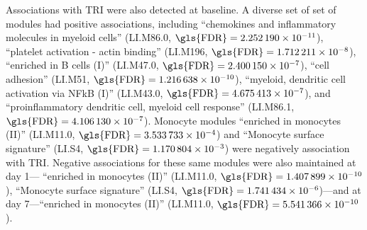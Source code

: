 Associations with \gls{TRI} were also detected at baseline.
A diverse set of set of modules had positive associations, including
\enquote{chemokines and inflammatory molecules in myeloid cells} (LI.M86.0,  $\text{\gls{FDR}} = \num{2.252190e-11}$),
\enquote{platelet activation - actin binding} (LI.M196, $\text{\gls{FDR}} = \num{1.712211e-08}$),
\enquote{enriched in B cells (I)} (LI.M47.0, $\text{\gls{FDR}} = \num{2.400150e-07}$),
\enquote{cell adhesion} (LI.M51, $\text{\gls{FDR}} = \num{1.216638e-10}$),
\enquote{myeloid, dendritic cell activation via NFkB (I)} (LI.M43.0, $\text{\gls{FDR}} = \num{4.675413e-07}$),
and \enquote{proinflammatory dendritic cell, myeloid cell response} (LI.M86.1, $\text{\gls{FDR}} = \num{4.106130e-07}$).
Monocyte modules 
\enquote{enriched in monocytes (II)} (LI.M11.0, $\text{\gls{FDR}} = \num{3.533733e-04}$) and
\enquote{Monocyte surface signature} (LI.S4, $\text{\gls{FDR}} = \num{1.170804e-03}$)
were negatively association with \gls{TRI}.
Negative associations for these same modules were also maintained at day 1--- \enquote{enriched in monocytes (II)} (LI.M11.0, $\text{\gls{FDR}} = \num{1.407899e-10}$),
\enquote{Monocyte surface signature} (LI.S4, $\text{\gls{FDR}} = \num{1.741434e-06}$)---and at day 7---\enquote{enriched in monocytes (II)} (LI.M11.0, $\text{\gls{FDR}} = \num{5.541366e-10}$).

